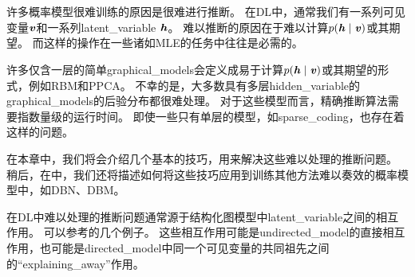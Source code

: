 \chapter{}
\label{chap:approximate_inference}


许多概率模型很难训练的原因是很难进行推断。
在\gls{DL}中，通常我们有一系列可见变量$\boldsymbol{\mathit{v}}$和一系列\gls{latent_variable} $\boldsymbol{\mathit{h}}$。
难以推断的原因在于难以计算$p(\boldsymbol{\mathit{h}}\mid\boldsymbol{\mathit{v}})$或其期望。
而这样的操作在一些诸如\gls{MLE}的任务中往往是必需的。


许多仅含一层的简单\gls{graphical_models}会定义成易于计算$p(\boldsymbol{\mathit{h}}\mid\boldsymbol{\mathit{v}})$或其期望的形式，例如\gls{RBM}和\gls{PPCA}。
不幸的是，大多数具有多层\gls{hidden_variable}的\gls{graphical_models}的后验分布都很难处理。
对于这些模型而言，精确推断算法需要指数量级的运行时间。
即使一些只有单层的模型，如\gls{sparse_coding}，也存在着这样的问题。


在本章中，我们将会介绍几个基本的技巧，用来解决这些难以处理的推断问题。
稍后，在中，我们还将描述如何将这些技巧应用到训练其他方法难以奏效的概率模型中，如\gls{DBN}、\gls{DBM}。


在\gls{DL}中难以处理的推断问题通常源于结构化图模型中\gls{latent_variable}之间的相互作用。
可以参考的几个例子。
这些相互作用可能是\gls{undirected_model}的直接相互作用，也可能是\gls{directed_model}中同一个可见变量的共同祖先之间的``\gls{explaining_away}''作用。



